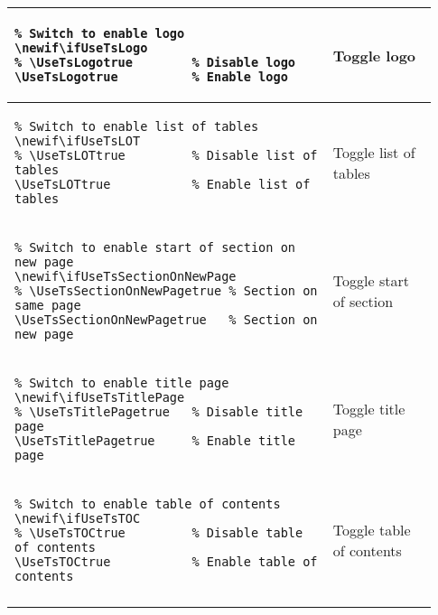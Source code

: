 \begin{footnotesize}
\begin{longtable}{ | P{0.7\linewidth} | p{0.23\linewidth} | }
        \hline
        \begin{BVerbatim}
\newif\ifUseTsLogo
\UseTsLogotrue          %
        \end{BVerbatim}
         & Toggle logo                                                          \\
        \hline
        \begin{BVerbatim}
\newif\ifUseTsLOT
\UseTsLOTtrue           %
        \end{BVerbatim}
         & Toggle list \newline of tables                                       \\
        \hline
        \begin{BVerbatim}
\newif\ifUseTsSectionOnNewPage
\UseTsSectionOnNewPagetrue   %
        \end{BVerbatim}
         & Toggle start \newline of section                                     \\
        \hline
        \begin{BVerbatim}
\newif\ifUseTsTitlePage
\UseTsTitlePagetrue     %
        \end{BVerbatim}
         & Toggle title page                                                    \\
        \hline
        \begin{BVerbatim}
\newif\ifUseTsTOC
\UseTsTOCtrue           %
        \end{BVerbatim}
         & Toggle table \newline of contents                                    \\
        \hline
    \end{longtable}
\end{footnotesize}

